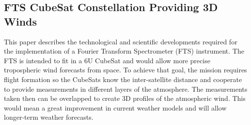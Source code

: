 \subsection{FTS CubeSat Constellation Providing 3D Winds}
\label{fts}
This paper describes the technological and scientific developments required for the implementation of a Fourier Transform Spectrometer (FTS) instrument. The FTS is intended to fit in a 6U CubeSat and would allow more precise tropospheric wind forecasts from space. To achieve that goal, the mission requires flight formation so the CubeSats know the inter-satellite distance and cooperate to provide measurements in different layers of the atmosphere. The measurements taken then can be overlapped to create 3D profiles of the atmospheric wind. This would mean a great improvement in current weather models and will allow longer-term weather forecasts. \cite{Wloszek_3Dwinds}
